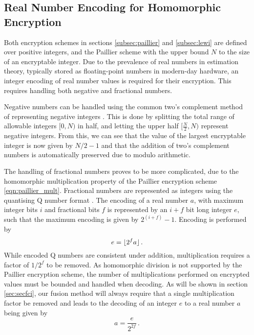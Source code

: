 \documentclass[letterpaper, 10 pt, conference]{ieeeconf}  %
\begin{document}
\subsection{Real Number Encoding for Homomorphic Encryption}
Both encryption schemes in sections \ref{subsec:paillier} and \ref{subsec:lewi} are defined over positive integers, and the Paillier scheme with the upper bound $N$ to the size of an encryptable integer. Due to the prevalence of real numbers in estimation theory, typically stored as floating-point numbers in modern-day hardware, an integer encoding of real number values is required for their encryption. This requires handling both negative and fractional numbers. 

Negative numbers can be handled using the common two's complement method of representing negative integers \cite{liljaDesigningDigitalComputer2004}. This is done by splitting the total range of allowable integers $[0, N)$ in half, and letting the upper half $[\frac{N}{2}, N)$ represent negative integers. From this, we can see that the value of the largest encryptable integer is now given by $N/2-1$ and that the addition of two's complement numbers is automatically preserved due to modulo arithmetic.

The handling of fractional numbers proves to be more complicated, due to the homomorphic multiplication property of the Paillier encryption scheme \eqref{eqn:paillier_mult}. Fractional numbers are represented as integers using the quantising Q number format \cite{oberstarFixedPointRepresentationFractional2007}. The encoding of a real number $a$, with maximum integer bits $i$ and fractional bits $f$ is represented by an $i+f$ bit long integer $e$, such that the maximum encoding is given by $2^{(i+f)}-1$. Encoding is performed by
\begin{equation}
   e = \lfloor{2^f a}\rfloor\,. \label{eqn:qmn}
\end{equation}
While encoded Q numbers are consistent under addition, multiplication requires a factor of $1/2^f$ to be removed. As homomorphic division is not supported by the Paillier encryption scheme, the number of multiplications performed on encrypted values must be bounded and handled when decoding. As will be shown in section \ref{sec:secfci}, our fusion method will always require that a single multiplication factor be removed and leads to the decoding of an integer $e$ to a real number $a$ being given by
\begin{equation}
   a = \frac{e}{2^{2f}}\,. \label{eqn:qmn_mult_decode}
\end{equation}
\end{document}
